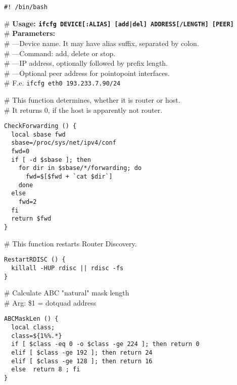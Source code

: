 \begin{verbatim}
#! /bin/bash
\end{verbatim}
\begin{flushleft}
\# {\bf Usage: \verb?ifcfg DEVICE[:ALIAS] [add|del] ADDRESS[/LENGTH] [PEER]?}\\
\# {\bf Parameters:}\\
\# ---Device name. It may have alias suffix, separated by colon.\\
\# ---Command: add, delete or stop.\\
\# ---IP address, optionally followed by prefix length.\\
\# ---Optional peer address for pointopoint interfaces.\\
\# F.e. \verb|ifcfg eth0 193.233.7.90/24|

\noindent\# This function determines, whether it is router or host.\\
\# It returns 0, if the host is apparently not router.
\end{flushleft}
\begin{verbatim}
CheckForwarding () {
  local sbase fwd
  sbase=/proc/sys/net/ipv4/conf
  fwd=0
  if [ -d $sbase ]; then
    for dir in $sbase/*/forwarding; do
      fwd=$[$fwd + `cat $dir`]
    done
  else
    fwd=2
  fi
  return $fwd
}
\end{verbatim}
\begin{flushleft}
\# This function restarts Router Discovery.\\
\end{flushleft}
\begin{verbatim}
RestartRDISC () {
  killall -HUP rdisc || rdisc -fs
}
\end{verbatim}
\begin{flushleft}
\# Calculate ABC "natural" mask length\\
\# Arg: \$1 = dotquad address
\end{flushleft}
\begin{verbatim}
ABCMaskLen () {
  local class;
  class=${1%%.*}
  if [ $class -eq 0 -o $class -ge 224 ]; then return 0
  elif [ $class -ge 192 ]; then return 24
  elif [ $class -ge 128 ]; then return 16
  else  return 8 ; fi
}
\end{verbatim}


